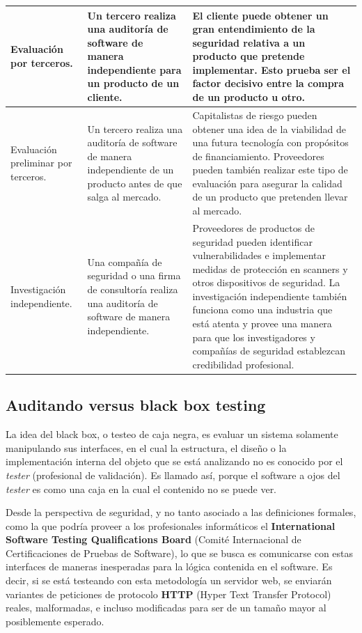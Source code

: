 \begin{tabular}{|p{4.3cm}|p{4.3cm}|p{4.3cm}|}
    \hline
    Evaluación por terceros. & Un tercero realiza una auditoría de software de manera independiente para un producto de un cliente. & El cliente puede obtener un gran entendimiento de la seguridad relativa a un producto que pretende implementar. Esto prueba ser el factor decisivo entre la compra de un producto u otro. \\
    \hline
    Evaluación preliminar por terceros. & Un tercero realiza una auditoría de software de manera independiente de un producto antes de que salga al mercado. & Capitalistas de riesgo pueden obtener una idea de la viabilidad de una futura tecnología con propósitos de financiamiento. Proveedores pueden también realizar este tipo de evaluación para asegurar la calidad de un producto que pretenden llevar al mercado. \\
    \hline
    Investigación independiente. & Una compañía de seguridad o una firma de consultoría realiza una auditoría de software de manera independiente. & Proveedores de productos de seguridad pueden identificar vulnerabilidades e implementar medidas de protección en scanners y otros dispositivos de seguridad. La investigación independiente también funciona como una industria que está atenta y provee una manera para que los investigadores y compañías de seguridad establezcan credibilidad profesional. \\
    \hline
\end{tabular}

\subsection{Auditando versus black box testing}
La idea del black box, o testeo de caja negra, es evaluar un sistema solamente manipulando sus interfaces, en el cual la estructura, el diseño o la implementación interna del objeto que se está analizando no es conocido por el \textit{tester} (profesional de validación). Es llamado así, porque el software a ojos del \textit{tester} es como una caja en la cual el contenido no se puede ver.

Desde la perspectiva de seguridad, y no tanto asociado a las definiciones formales, como la que podría proveer a los profesionales informáticos el \textbf{International Software Testing Qualifications Board} (Comité Internacional de Certificaciones de Pruebas de Software), lo que se busca es comunicarse con estas interfaces de maneras inesperadas para la lógica contenida en el software. Es decir, si se está testeando con esta metodología un servidor web, se enviarán variantes de peticiones de protocolo \textbf{HTTP} (Hyper Text Transfer Protocol) reales, malformadas, e incluso modificadas para ser de un tamaño mayor al posiblemente esperado.

